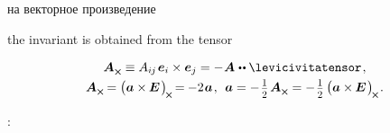 {на векторное произведение

the invariant is obtained from the tensor


\nopagebreak\vspace{-0.15em}
\begin{equation}\label{pseudovectorinvariant}
\begin{array}{c}
\bm{A}_{\Xcompanion} \equiv A_{i\hspace{-0.1ex}j} \hspace{.25ex} \bm{e}_i \times \bm{e}_j = - \hspace{.1ex} \bm{A} \hspace{.1ex} \dotdotp \levicivitatensor
\hspace{.2ex}, \\[.3em]
%
\bm{A}_{\Xcompanion} \hspace{-0.16ex} = \left(^{\mathstrut} \hspace{-0.1ex} \bm{a} \times\hspace{-0.1ex} \UnitDyad \hspace{.2ex} \right)_{\hspace{-0.25ex}\Xcompanion} \hspace{-0.25ex} = \hspace{-0.12ex}
- 2 \hspace{.16ex} \bm{a} \hspace{.2ex},\:\:
\bm{a} = - \hspace{.2ex} \smalldisplaystyleonehalf \hspace{.25ex} \bm{A}_{\Xcompanion} = - \hspace{.2ex} \smalldisplaystyleonehalf \left(^{\mathstrut} \hspace{-0.1ex} \bm{a} \times\hspace{-0.1ex} \UnitDyad \hspace{.2ex} \right)_{\hspace{-0.25ex}\Xcompanion} \hspace{-0.2ex}.
\end{array}
\end{equation}

:

}
